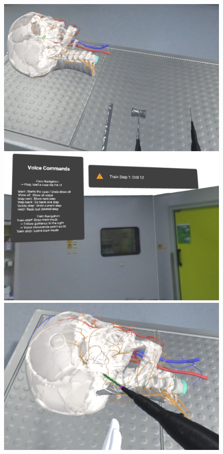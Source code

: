 \begin{figure}
    \centering
    \begin{minipage}{.5\textwidth}
      \centering
      \includegraphics[width=0.997\linewidth]{images/implementation/features/training/train_1.png}
    \end{minipage}%
    \begin{minipage}{.5\textwidth}
      \centering
      \includegraphics[width=0.997\linewidth]{images/implementation/features/training/train_2.png}
    \end{minipage}
    \begin{minipage}{0.5\textwidth}
        \centering
        \includegraphics[width=0.997\linewidth]{images/implementation/features/training/train_3.png}

\end{minipage}
\end{figure}
